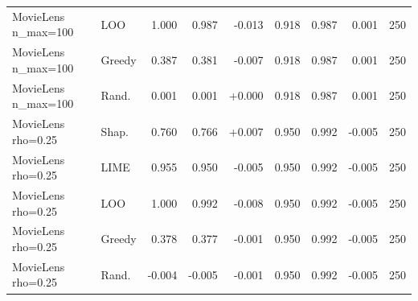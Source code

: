 \begin{table}[!htbp]
\begin{tabular}{@{}llrrrrrrr@{}}
MovieLens n\_max=100 & LOO & 1.000 & 0.987 & -0.013 & 0.918 & 0.987 & 0.001 & 250 \\
MovieLens n\_max=100 & Greedy & 0.387 & 0.381 & -0.007 & 0.918 & 0.987 & 0.001 & 250 \\
MovieLens n\_max=100 & Rand. & 0.001 & 0.001 & +0.000 & 0.918 & 0.987 & 0.001 & 250 \\
MovieLens rho=0.25 & Shap. & 0.760 & 0.766 & +0.007 & 0.950 & 0.992 & -0.005 & 250 \\
MovieLens rho=0.25 & LIME & 0.955 & 0.950 & -0.005 & 0.950 & 0.992 & -0.005 & 250 \\
MovieLens rho=0.25 & LOO & 1.000 & 0.992 & -0.008 & 0.950 & 0.992 & -0.005 & 250 \\
MovieLens rho=0.25 & Greedy & 0.378 & 0.377 & -0.001 & 0.950 & 0.992 & -0.005 & 250 \\
MovieLens rho=0.25 & Rand. & -0.004 & -0.005 & -0.001 & 0.950 & 0.992 & -0.005 & 250 \\
\bottomrule
\end{tabular}
\end{table}